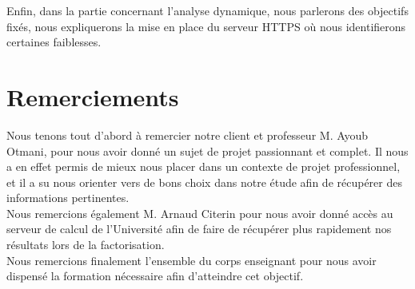Enfin, dans la partie concernant l'analyse dynamique, nous parlerons des objectifs fixés, nous expliquerons la mise en place du serveur HTTPS où nous identifierons certaines faiblesses.

\section*{Remerciements}

Nous tenons tout d'abord à remercier notre client et professeur M. Ayoub Otmani, pour nous avoir donné un sujet de projet passionnant et complet. Il nous a en effet permis de mieux nous placer dans un contexte de projet professionnel, et il a su nous orienter vers de bons choix dans notre étude afin de récupérer des informations pertinentes.\\

Nous remercions également M. Arnaud Citerin pour nous avoir donné accès au serveur de calcul de l'Université afin de faire de récupérer plus rapidement nos résultats lors de la factorisation.\\

Nous remercions finalement l'ensemble du corps enseignant pour nous avoir dispensé la formation nécessaire afin d'atteindre cet objectif.
